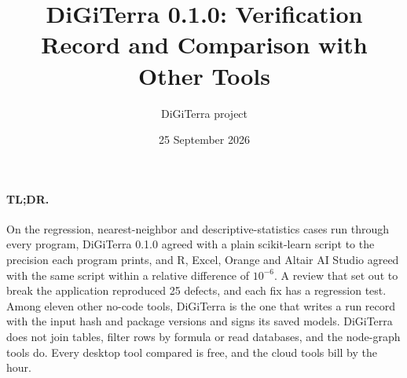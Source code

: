 \newcommand{\DocFooter}{DiGiTerra 0.1.0 verification record and comparison, 2026-09-25}

\title{DiGiTerra 0.1.0: Verification Record and Comparison with Other Tools}
\author{DiGiTerra project}
\date{25 September 2026}

\maketitle

\paragraph{TL;DR.} On the regression, nearest-neighbor and descriptive-statistics cases run through every program, DiGiTerra 0.1.0 agreed with a plain scikit-learn script to the precision each program prints, and R, Excel, Orange and Altair AI Studio agreed with the same script within a relative difference of $10^{-6}$. A review that set out to break the application reproduced 25 defects, and each fix has a regression test. Among eleven other no-code tools, DiGiTerra is the one that writes a run record with the input hash and package versions and signs its saved models. DiGiTerra does not join tables, filter rows by formula or read databases, and the node-graph tools do. Every desktop tool compared is free, and the cloud tools bill by the hour.












